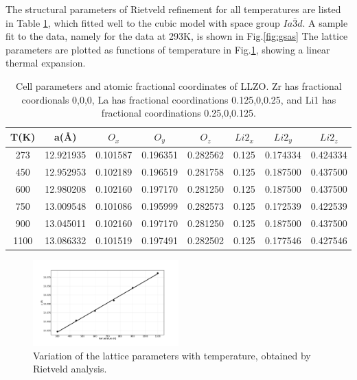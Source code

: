 \documentclass[twoside,twocolumn,9pt]{article}
\begin{document}
The structural parameters of Rietveld refinement for all temperatures are listed in Table \ref{tab:cell_parameters},
which fitted well to the cubic model with space group $Ia\bar{3}d$. A sample fit to the data, namely for the data at 293K, is shown in Fig.\ref{fig:gsas}
The lattice parameters are plotted as functions of temperature in Fig.\ref{fig:lattice}, showing a linear thermal expansion.


\begin{table}[h]
\centering
\caption{Cell parameters and atomic fractional coordinates of LLZO. Zr has fractional coordionals 0,0,0, La has fractional coordinations 0.125,0,0.25, and Li1 has fractional coordinations 0.25,0,0.125. } \label{tab:cell_parameters}
\begin{tabular}{cccccccc}
\hline
\hline
T(K)  & a(\AA)   & $O_{x}$      & $O_{y}$             & $O_{z}$       & $Li2_{x}$      & $Li2_{y}$           & $Li2_{z}$      \\
\hline
273  & 12.921935 & 0.101587    & 0.196351             &0.282562       & 0.125          & 0.174334            & 0.424334       \\
450  & 12.952953 & 0.102189    & 0.196519             &0.281758       & 0.125          & 0.187500            & 0.437500       \\
600  & 12.980208 & 0.102160    & 0.197170             &0.281250       & 0.125          & 0.187500            & 0.437500       \\
750  & 13.009548 & 0.101086    & 0.195999             &0.282573       & 0.125          & 0.172539            & 0.422539       \\
900  & 13.045011 & 0.102160    & 0.197170             &0.281250       & 0.125          & 0.187500            & 0.437500       \\
1100 & 13.086332 & 0.101519    & 0.197491             &0.282502       & 0.125          & 0.177546            & 0.427546       \\
\hline
\hline
\end{tabular}
\end{table}


\begin{figure}
\centering
\includegraphics[width=0.5\textwidth]{Pics/lattice.pdf}
\caption{Variation of the lattice parameters with temperature, obtained by Rietveld analysis. }
\label{fig:lattice}
\end{figure}
\end{document}
